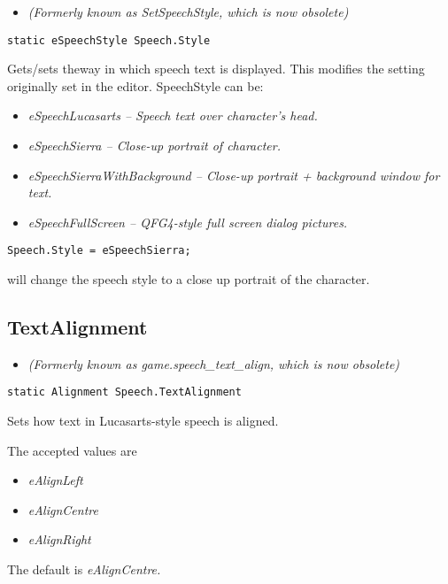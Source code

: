 \begin{itemize}
\item \it{(Formerly known as SetSpeechStyle, which is now obsolete)}
\end{itemize}

\begin{verbatim}
static eSpeechStyle Speech.Style
\end{verbatim}

Gets/sets theway in which speech text is displayed. This modifies the setting
originally set in the editor. SpeechStyle can be:
\begin{itemize}
\item \it{eSpeechLucasarts} -- Speech text over character's head.
\item \it{eSpeechSierra} -- Close-up portrait of character.
\item \it{eSpeechSierraWithBackground} -- Close-up portrait + background window for text.
\item \it{eSpeechFullScreen} -- QFG4-style full screen dialog pictures.
\end{itemize}

\begin{verbatim}
Speech.Style = eSpeechSierra;
\end{verbatim}
will change the speech style to a close up portrait of the character.


\subsection{TextAlignment}\label{Speech.TextAlignment}%

\begin{itemize}
\item \it{(Formerly known as game.speech_text_align, which is now obsolete)}
\end{itemize}

\begin{verbatim}
static Alignment Speech.TextAlignment
\end{verbatim}

Sets how text in Lucasarts-style speech is aligned.

The accepted values are
\begin{itemize}
\item \it{eAlignLeft}
\item \it{eAlignCentre}
\item \it{eAlignRight}
\end{itemize}
The default is \it{eAlignCentre}.

